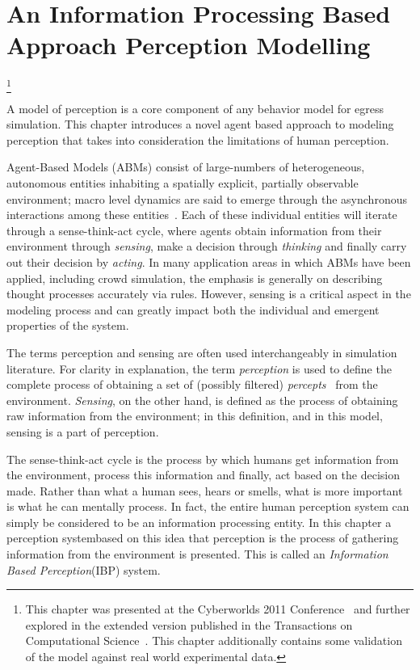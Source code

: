 
\chapter{An Information Processing Based Approach Perception Modelling}\footnote{This chapter was presented at the Cyberworlds 2011 Conference~\cite{Viswanathan:2011uy} and further explored in the extended version published in the Transactions on Computational Science~\cite{Viswanathan:ut}. This chapter additionally contains some validation of the model against real world experimental data.}
\label{chapter:IBP}

A model of perception is a core component of any behavior model for egress simulation. This chapter introduces a novel agent based approach to modeling perception that takes into consideration the limitations of human perception.

Agent-Based Models (ABMs) consist of large-numbers of heterogeneous, autonomous entities inhabiting a spatially explicit, partially observable environment; macro level dynamics are said to emerge through the asynchronous interactions among these entities~\cite{Bonabeau:2002um,Epstein:1999vn}. Each of these individual entities will iterate through a sense-think-act cycle, where agents obtain information from their environment through {\em sensing}, make a decision through {\em thinking} and finally carry out their decision by {\em acting}. In many application areas in which ABMs have been applied, including crowd simulation, the emphasis is generally on describing thought processes accurately via rules. However, sensing is a critical aspect in the modeling process and can greatly impact both the individual and emergent properties of the system.

The terms perception and sensing are often used interchangeably in simulation literature. For clarity in explanation, the term {\em perception} is used to define the complete process of obtaining a set of (possibly filtered) \emph{percepts}~\cite{Russel:1995vi} from the environment. {\em Sensing}, on the other hand, is defined as the process of obtaining raw information from the environment; in this definition, and in this model, sensing is a part of perception.

The sense-think-act cycle is the process by which humans get information from the environment, process this information and finally, act based on the decision made. Rather than what a human sees, hears or smells, what is more important is what he can mentally process. In fact, the entire human perception system can simply be considered to be an information processing entity. In this chapter a perception systembased on this idea that perception is the process of gathering information from the environment is presented. This is called an \emph{Information Based Perception}(IBP) system.

